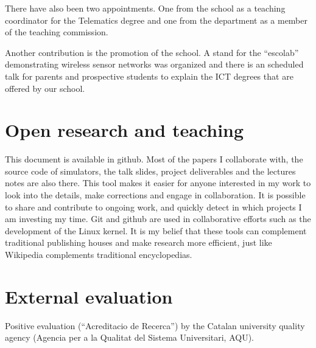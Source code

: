 \documentclass[a4paper,twocolumns]{article}%
\begin{document}
There have also been two appointments.
One from the school as a teaching coordinator for the Telematics degree and one from the department as a member of the teaching commission.

Another contribution is the promotion of the school.
A stand for the ``escolab'' demonstrating wireless sensor networks was organized and there is an scheduled talk for parents and prospective students to explain the ICT degrees that are offered by our school.


\section{Open research and teaching}

This document is available in github.
Most of the papers I collaborate with, the source code of simulators, the talk slides, project deliverables and the lectures notes are also there.
This tool makes it easier for anyone interested in my work to look into the details, make corrections and engage in collaboration.
It is possible to share and contribute to ongoing work, and quickly detect in which projects I am investing my time.
Git and github are used in collaborative efforts such as the development of the Linux kernel.
It is my belief that these tools can complement traditional publishing houses and make research more efficient, just like Wikipedia complements traditional encyclopedias. 

\section{External evaluation}

Positive evaluation (``Acreditacio de Recerca'') by the Catalan university quality agency (Agencia per a la Qualitat del Sistema Universitari, AQU).




\end{document}
